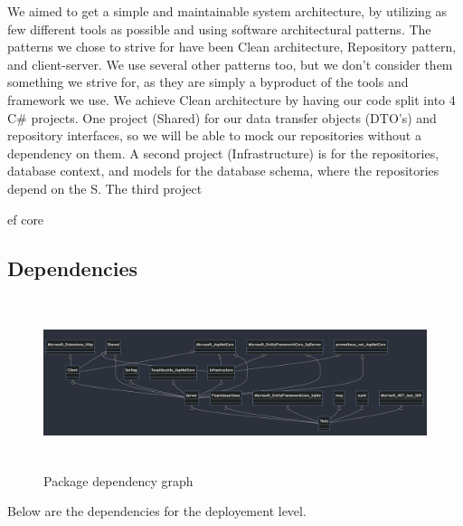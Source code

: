 We aimed to get a simple and maintainable system architecture, by utilizing as few different tools as possible and using software architectural patterns. The patterns we chose to strive for have been Clean architecture, Repository pattern, and client-server. We use several other patterns too, but we don't consider them something we strive for, as they are simply a byproduct of the tools and framework we use. We achieve Clean architecture by having our code split into 4 C\# projects. One project (Shared) for our data transfer objects (DTO's) and repository interfaces, so we will be able to mock our repositories without a dependency on them. A second project (Infrastructure) is for the repositories, database context, and models for the database schema, where the repositories depend on the S. The third project 

ef core






\subsection{Dependencies}


\begin{figure}[H]
    \centering
    \includegraphics[width = 15.0cm, height = 5.0cm]{Images/dependencies2.png}
    \caption{Package dependency graph}
    \label{fig:packageDependencyGraph}
\end{figure}

Below are the dependencies for the deployement level. 

